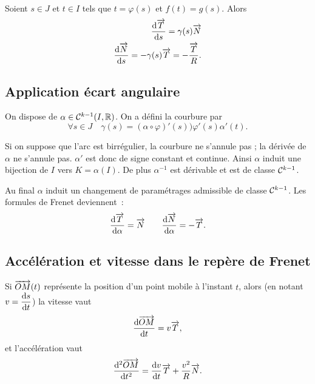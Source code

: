   Soient \(s \in J\) et \(t \in I\) tels que \(t=\varphi(s)\) et \(f(t)=g(s)\). 
  Alors
  \begin{align}
    \dfrac{\mathrm{d} \overrightarrow{T}}{\mathrm{d} s} = \gamma(s) \overrightarrow{N} \\
    \dfrac{\mathrm{d} \overrightarrow{N}}{\mathrm{d} s} = -\gamma(s)\overrightarrow{T}=-\frac{\overrightarrow{T}}{R}.
  \end{align}

  \subsection{Application écart angulaire}

  On dispose de \(\alpha \in \mathcal{C}^{k-1}(I, \mathbb{R})\). On a défini la courbure par
  \begin{equation}
    \forall s \in J \quad \gamma(s) = (\alpha \circ \varphi)'(s) ) 
    \varphi'(s)\alpha'(t).
  \end{equation}

  Si on suppose que l'arc est birrégulier, la courbure ne s'annule pas ; la 
  dérivée de \(\alpha\) ne s'annule pas. \(\alpha'\) est donc de signe constant 
  et continue. Ainsi \(\alpha\) induit une bijection de \(I\) vers 
  \(K=\alpha(I)\). De plus \(\alpha^{-1}\) est dérivable et est de classe 
  \(\mathcal{C}^{k-1}\). 

  Au final \(\alpha\) induit un changement de paramétrages admissible de classe 
  \(\mathcal{C}^{k-1}\). Les formules de Frenet deviennent~:
  \begin{equation}
    \dfrac{\mathrm{d} \overrightarrow{T}}{\mathrm{d} \alpha}=\overrightarrow{N} \qquad 
    \dfrac{\mathrm{d} \overrightarrow{N}}{\mathrm{d} \alpha}=-\overrightarrow{T}.
  \end{equation}

  \subsection{Accélération et vitesse dans le repère de Frenet}

  Si \(\overrightarrow{OM}(t)\) représente la position d'un point mobile à l'instant 
  \(t\), alors (en notant\(v=\dfrac{\mathrm{d} s}{\mathrm{d} t}\)) la vitesse vaut
  \begin{equation}
    \dfrac{\mathrm{d} \overrightarrow{OM}}{\mathrm{d} t} = v \overrightarrow{T},
  \end{equation}
  et l'accélération vaut
  \begin{equation}
    \dfrac{\mathrm{d}^2 \overrightarrow{OM}}{\mathrm{d} {t}^2} = \dfrac{\mathrm{d} v}{\mathrm{d} t} \overrightarrow{T} + \frac{v^2}{R} \overrightarrow{N}.
  \end{equation}
